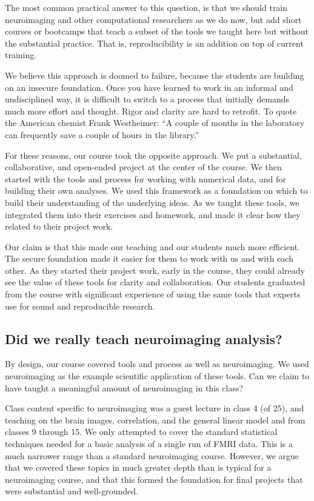 The most common practical answer to this question, is that we should train
neuroimaging and other computational researchers as we do now, but add short
courses or bootcamps that teach a subset of the tools we taught here but
without the substantial practice.  That is, reproducibility is an addition on
top of current training.

We believe this approach is doomed to failure, because the students are
building on an insecure foundation.  Once you have learned to work in an
informal and undisciplined way, it is difficult to switch to a process that
initially demands much more effort and thought.  Rigor and clarity are hard to
retrofit.
To quote the American chemist Frank Westheimer:
``A couple of months in the laboratory can frequently save a couple of hours
in the library.''

For these reasons, our course took the opposite approach.
We put a substantial, collaborative, and open-ended project at the center of
the course.
We then started with the tools and process for working with numerical data, and
for building their own analyses.
We used this framework as a foundation on which to build their understanding of
the underlying ideas.
As we taught these tools, we integrated them into their exercises and homework,
and made it clear how they related to their project work.

Our claim is that this made our teaching and our students much more efficient.
The secure foundation made it easier for them to work with us and with each
other. As they started their project work, early in the course, they could
already see the value of these tools for clarity and collaboration. Our
students graduated from the course with significant experience of using the
same tools that experts use for sound and reproducible research.

\subsection{Did we really teach neuroimaging analysis?}

By design, our course covered tools and process as well as neuroimaging.  We
used neuroimaging as the example scientific application of these tools.  Can
we claim to have taught a meaningful amount of neuroimaging in this class?

Class content specific to neuroimaging was a guest lecture in class 4 (of 25),
and teaching on the brain images, correlation, and the general linear model and
from classes 9 through 15.  We only attempted to cover the standard
statistical techniques needed for a basic analysis of a single run of FMRI
data.  This is a much narrower range than a standard neuroimaging course.
However, we argue that we covered these topics in much greater depth than is
typical for a neuroimaging course, and that this formed the foundation for
final projects that were substantial and well-grounded.

